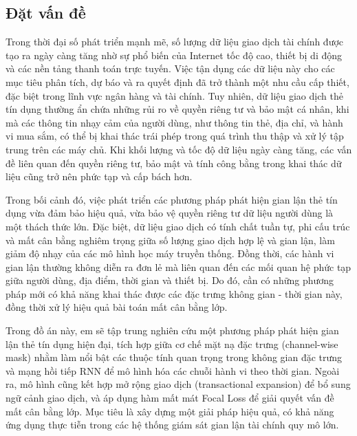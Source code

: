 \subsection*{Đặt vấn đề}

Trong thời đại số phát triển mạnh mẽ, số lượng dữ liệu giao dịch tài chính được tạo ra ngày càng tăng nhờ sự phổ biến của Internet tốc độ cao, thiết bị di động và các nền tảng thanh toán trực tuyến. Việc tận dụng các dữ liệu này cho các mục tiêu phân tích, dự báo và ra quyết định đã trở thành một nhu cầu cấp thiết, đặc biệt trong lĩnh vực ngân hàng và tài chính. Tuy nhiên, dữ liệu giao dịch thẻ tín dụng thường ẩn chứa những rủi ro về quyền riêng tư và bảo mật cá nhân, khi mà các thông tin nhạy cảm của người dùng, như thông tin thẻ, địa chỉ, và hành vi mua sắm, có thể bị khai thác trái phép trong quá trình thu thập và xử lý tập trung trên các máy chủ. Khi khối lượng và tốc độ dữ liệu ngày càng tăng, các vấn đề liên quan đến quyền riêng tư, bảo mật và tính công bằng trong khai thác dữ liệu cũng trở nên phức tạp và cấp bách hơn.

Trong bối cảnh đó, việc phát triển các phương pháp phát hiện gian lận thẻ tín dụng vừa đảm bảo hiệu quả, vừa bảo vệ quyền riêng tư dữ liệu người dùng là một thách thức lớn. Đặc biệt, dữ liệu giao dịch có tính chất tuần tự, phi cấu trúc và mất cân bằng nghiêm trọng giữa số lượng giao dịch hợp lệ và gian lận, làm giảm độ nhạy của các mô hình học máy truyền thống. Đồng thời, các hành vi gian lận thường không diễn ra đơn lẻ mà liên quan đến các mối quan hệ phức tạp giữa người dùng, địa điểm, thời gian và thiết bị. Do đó, cần có những phương pháp mới có khả năng khai thác được các đặc trưng không gian - thời gian này, đồng thời xử lý hiệu quả bài toán mất cân bằng lớp.

Trong đồ án này, em sẽ tập trung nghiên cứu một phương pháp phát hiện gian lận thẻ tín dụng hiện đại, tích hợp giữa cơ chế mặt nạ đặc trưng (channel-wise mask) nhằm làm nổi bật các thuộc tính quan trọng trong không gian đặc trưng và mạng hồi tiếp RNN để mô hình hóa các chuỗi hành vi theo thời gian. Ngoài ra, mô hình cũng kết hợp mở rộng giao dịch (transactional expansion) để bổ sung ngữ cảnh giao dịch, và áp dụng hàm mất mát Focal Loss để giải quyết vấn đề mất cân bằng lớp. Mục tiêu là xây dựng một giải pháp hiệu quả, có khả năng ứng dụng thực tiễn trong các hệ thống giám sát gian lận tài chính quy mô lớn.

